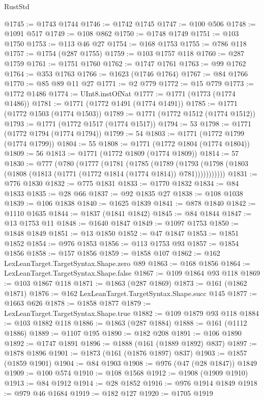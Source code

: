 \begin{lexlean}{RustStd}
\begin{coremodule}
{\begin{coremodule}
{{{{{{{{{{{{{{{{{{{{{{{{{{@1745 := @1743 @1744
@1746 := @1742 @1745
@1747 := @100 @506
@1748 := @1091 @517
@1749 := @108 @862
@1750 := @1748 @1749
@1751 := @103 @1750
@1753 := @113 @46 @27
@1754 := @168 @1753
@1755 := @786 @118
@1757 := @1754 (@287 @1755)
@1759 := @103 @1757 @118
@1760 := @287 @1759
@1761 := @1751 @1760
@1762 := @1747 @1761
@1763 := @99 @1762
@1764 := @353 @1763
@1766 := @1623 (@1746 @1764)
@1767 := @84 @1766
@1770 := @85 @89 @11 @27
@1771 := @2 @779
@1772 := @15 @779
@1773 := @1772 @1486
@1774 := UInt8.instOfNat
@1777 := @1771 (@1773 (@1774 @1486))
@1781 := @1771 (@1772 @1491 (@1774 @1491))
@1785 := @1771 (@1772 @1503 (@1774 @1503))
@1789 := @1771 (@1772 @1512 (@1774 @1512))
@1793 := @1771 (@1772 @1517 (@1774 @1517))
@1794 := 53
@1798 := @1771 (@1772 @1794 (@1774 @1794))
@1799 := 54
@1803 := @1771 (@1772 @1799 (@1774 @1799))
@1804 := 55
@1808 := @1771 (@1772 @1804 (@1774 @1804))
@1809 := 56
@1813 := @1771 (@1772 @1809 (@1774 @1809))
@1814 := 57
@1830 := @777
    (@780
      (@1777
        (@1781
          (@1785
            (@1789
              (@1793 (@1798 (@1803 (@1808 (@1813 (@1771 (@1772 @1814 (@1774 @1814)) @781)))))))))))
@1831 := @776 @1830
@1832 := @775 @1831
@1833 := @1770 @1832
@1834 := @84 @1833
@1835 := @28 @66
@1837 := @92 @1835 @27
@1838 := @108 @1038
@1839 := @106 @1838
@1840 := @1625 @1839
@1841 := @878 @1840
@1842 := @1110 @1635
@1844 := @1837 (@1841 @1842)
@1845 := @84 @1844
@1847 := @13 @1753 @11
@1848 := @1640 @1847
@1849 := @1097 @1753
@1850 := @1848 @1849
@1851 := @13 @1850
@1852 := @47 @1847
@1853 := @1851 @1852
@1854 := @976 @1853
@1856 := @113 @1753 @93
@1857 := @1854 @1856
@1858 := @157 @1856
@1859 := @1858 @107
@1862 := @162 LexLeanTarget.TargetSyntax.Shape.zero @89
@1863 := @168 @1856
@1864 := LexLeanTarget.TargetSyntax.Shape.false
@1867 := @109 @1864 @93 @118
@1869 := @103 @1867 @118
@1871 := @1863 (@287 @1869)
@1873 := @161 (@1862 @1871)
@1876 := @162 LexLeanTarget.TargetSyntax.Shape.succ @145
@1877 := @1663 @626
@1878 := @1858 @1877
@1879 := LexLeanTarget.TargetSyntax.Shape.true
@1882 := @109 @1879 @93 @118
@1884 := @103 @1882 @118
@1886 := @1863 (@287 @1884)
@1888 := @161 (@1112 @1886)
@1889 := @1107 @195
@1890 := @182 @208
@1891 := @106 @1890
@1892 := @1747 @1891
@1896 := @1888 (@161 (@1889 @1892) @837)
@1897 := @1878 @1896
@1901 := @1873 (@161 (@1876 @1897) @837)
@1903 := @1857 (@1859 @1901)
@1904 := @84 @1903
@1908 := @976 (@47 (@28 @1847)) @1849
@1909 := @100 @574
@1910 := @108 @1568
@1912 := @1908 (@1909 @1910)
@1913 := @84 @1912
@1914 := @28 @1852
@1916 := @976 @1914 @1849
@1918 := @979 @46 @1684
@1919 := @182 @127
@1920 := @1705 @1919
}}}}}}}}}}}}}}}}}}}}}}}}}}
\end{coremodule}}
\end{coremodule}
\end{lexlean}
